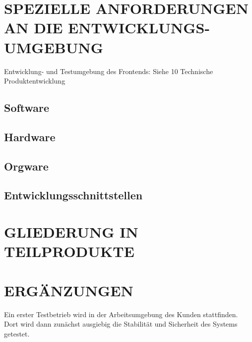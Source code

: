 	\section{\Large SPEZIELLE ANFORDERUNGEN AN DIE ENTWICKLUNGS-UMGEBUNG}
	Entwicklung- und Testumgebung des Frontends: Siehe 10 Technische Produktentwicklung 
	\subsection{Software}
	\subsection{Hardware}
	\subsection{Orgware}
	\subsection{Entwicklungsschnittstellen}
	
	
	\section{\Large GLIEDERUNG IN TEILPRODUKTE}
	
	
	\section{\Large ERGÄNZUNGEN}
	Ein erster Testbetrieb wird in der Arbeitsumgebung des Kunden stattfinden. Dort wird dann zunächst ausgiebig die Stabilität und Sicherheit des Systems getestet.
	
\newpage
